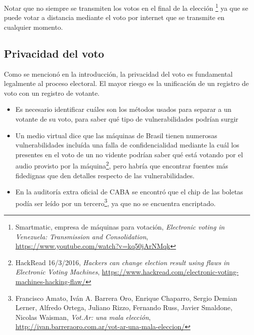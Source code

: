 \documentclass[a4,11pt]{article}
\begin{document}
\begin{itemize}
\begin{itemize}
\end{itemize}
\end{itemize}


Notar que no siempre se transmiten los votos en el final de la elección \footnote{Smartmatic, empresa de máquinas para votación, \textit{Electronic voting in Venezuela: Transmission and Consolidation}, \url{https://www.youtube.com/watch?v=kq50jArNMqk}} ya que se puede votar a distancia mediante el voto por internet que se transmite en cualquier momento.


\subsection{Privacidad del voto}

Como se mencionó en la introducción, la privacidad del voto es fundamental legalmente al proceso electoral. El mayor riesgo es la unificación de un registro de voto con un registro de votante.

\begin{itemize}
\item Es necesario identificar cuáles son los métodos usados para separar a un votante de su voto, para saber qué tipo de vulnerabilidades podrían surgir
\item Un medio virtual dice que las máquinas de Brasil tienen numerosas vulnerabilidades incluída una falla de confidencialidad mediante la cuál los presentes en el voto de un no vidente podrían saber qué está votando por el audio provisto por la máquina\footnote{HackRead 16/3/2016, \textit{Hackers can change election result using flaws in Electronic Voting Machines}, \url{https://www.hackread.com/electronic-voting-machines-hacking-flaw/}}, pero habría que encontrar fuentes más fidedignas que den detalles respecto de las vulnerabilidades.
\item En la auditoría extra oficial de CABA se encontró que el chip de las boletas podía ser leído por un tercero\footnote{Francisco Amato, Iván A. Barrera Oro, Enrique Chaparro, Sergio Demian Lerner, Alfredo Ortega, Juliano Rizzo, Fernando Russ, Javier Smaldone, Nicolas Waisman, \textit{Vot.Ar: una mala elección}, \url{http://ivan.barreraoro.com.ar/vot-ar-una-mala-eleccion/}}, ya que no se encuentra encriptado.
\end{itemize}
\end{document}
